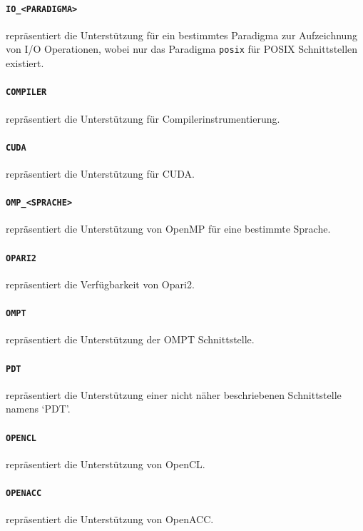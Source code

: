 \documentclass[german,proseminar,hyperref,utf8,lof]{zihpub}
\begin{document}
    \paragraph{\texttt{IO\_<PARADIGMA>}} repräsentiert die Unterstützung für ein bestimmtes Paradigma zur
    Aufzeichnung von I/O Operationen, wobei nur das Paradigma \texttt{posix} für POSIX Schnittstellen existiert.

    \paragraph{\texttt{COMPILER}} repräsentiert die Unterstützung für Compilerinstrumentierung.

    \paragraph{\texttt{CUDA}} repräsentiert die Unterstützung für CUDA.

    \paragraph{\texttt{OMP\_<SPRACHE>}} repräsentiert die Unterstützung von OpenMP für eine bestimmte Sprache.

    \paragraph{\texttt{OPARI2}} repräsentiert die Verfügbarkeit von Opari2.

    \paragraph{\texttt{OMPT}} repräsentiert die Unterstützung der OMPT Schnittstelle.

    \paragraph{\texttt{PDT}} repräsentiert die Unterstützung einer nicht näher beschriebenen Schnittstelle
    namens `PDT'.

    \paragraph{\texttt{OPENCL}} repräsentiert die Unterstützung von OpenCL.

    \paragraph{\texttt{OPENACC}} repräsentiert die Unterstützung von OpenACC.
\end{document}
